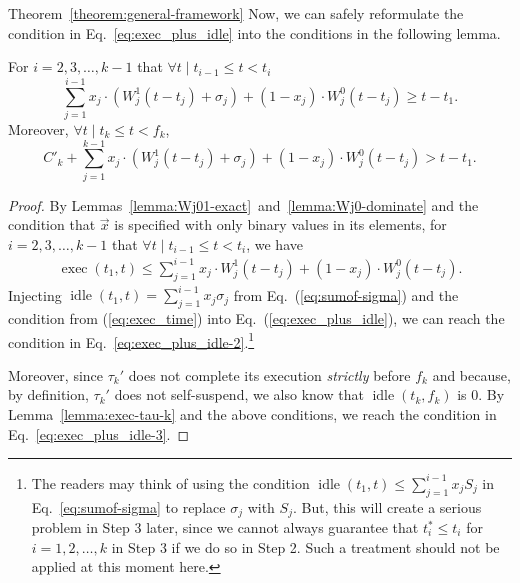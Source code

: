 \begin{appProof}{Theorem~\ref{theorem:general-framework}}
Now, we can safely reformulate the condition in Eq.~\eqref{eq:exec_plus_idle} into the conditions in the following lemma.
\begin{Lemma}
  \label{lemma:conclusion-step2}
For $i=2,3,\ldots,k-1$ that $\forall t \mid t_{i-1} \leq t < t_i$
\begin{equation}
\label{eq:exec_plus_idle-2}
\sum_{j=1}^{i-1} x_j\cdot (W_j^1(t-t_j) +\sigma_j) + (1-x_j)\cdot W_j^0(t-t_j) \geq t-t_1.
\end{equation}
 Moreover, $\forall t \mid t_k \leq t < f_k$,
\begin{equation}
\label{eq:exec_plus_idle-3}
C'_k +\sum_{j=1}^{k-1} x_j\cdot (W_j^1(t-t_j) +\sigma_j) + (1-x_j)\cdot W_j^0(t-t_j) > t-t_1.
\end{equation} 
\end{Lemma}
\begin{proof}
  By Lemmas~\ref{lemma:Wj01-exact}~and~\ref{lemma:Wj0-dominate} and the condition that $\vec{x}$
  is specified with only binary values in its elements, for
  $i=2,3,\ldots,k-1$ that $\forall t \mid t_{i-1} \leq t < t_i$, we
  have
{\small \begin{align}
\label{eq:exec_time}
\operatorname{exec}(t_1, t) \leq \sum_{j=1}^{i-1} x_j\cdot W_j^1(t-t_j)  + (1-x_j)\cdot W_j^0(t-t_j).
\end{align}} Injecting $\operatorname{idle}(t_1, t) = \sum_{j=1}^{i-1}
x_j \sigma_j $ from Eq.~(\ref{eq:sumof-sigma}) and the condition from
(\ref{eq:exec_time}) into Eq.~(\ref{eq:exec_plus_idle}), we can reach
the condition in Eq.~\eqref{eq:exec_plus_idle-2}.\footnote{\label{footnote-why-sigma}The readers
  may think of using the condition $\operatorname{idle}(t_1, t) \leq
  \sum_{j=1}^{i-1} x_j S_j$ in Eq.~\eqref{eq:sumof-sigma} to
  replace $\sigma_j$ with $S_j$. But, this will create a serious
  problem in Step 3 later, since we cannot always guarantee that
  $t_i^*\leq t_i$ for $i=1,2,\ldots,k$ in Step 3 if we do so in Step 2. Such a treatment should not be applied at this moment here.} 

Moreover, since $\tau_k'$ does not complete its execution
\emph{strictly} before $f_k$ and because, by definition, $\tau_k'$
does not self-suspend, we also know that $\operatorname{idle}(t_k,
f_k)$ is $0$. By Lemma~\ref{lemma:exec-tau-k} and the above
conditions, we reach the condition in Eq.~\eqref{eq:exec_plus_idle-3}.
\end{proof}





\end{appProof}
